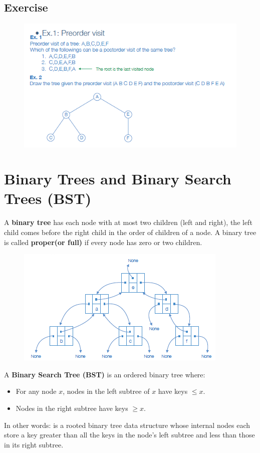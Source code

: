 \subsection{Exercise}
\begin{figure}[h!]
    \centering
    \includegraphics[width=1\linewidth]{immagini/tree4.png}
\end{figure}

\section{Binary Trees and Binary Search Trees (BST)}
A \textbf{binary tree} has each node with at most two children (left and right), the left child comes before the right child in the order of children of a node.
A binary tree is called \textbf{proper(or full)} if every node has zero or two children.
\begin{figure}[h!]
    \centering
    \includegraphics[width=0.75\linewidth]{immagini/tree5.png}
\end{figure}
A \textbf{Binary Search Tree (BST)} is an ordered binary tree where:
\begin{itemize}
    \item For any node \( x \), nodes in the left subtree of \( x \) have keys \( \leq x \).
    \item Nodes in the right subtree have keys \( \geq x \).
\end{itemize}
In other words: is a rooted binary tree data structure whose internal nodes each store a key greater than all the keys in
the node’s left subtree and less than those in its right subtree.

